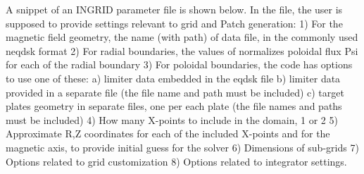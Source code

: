 \onecolumngrid
A snippet of an INGRID parameter file is shown below.
In the file, the user is supposed to provide settings relevant to grid and Patch generation:
1) For the magnetic field geometry, the name (with path) of data file, in the commonly used neqdsk format
2) For radial boundaries, the values of normalizes poloidal flux Psi for each of the radial boundary
3) For poloidal boundaries, the code has options to use one of these: 
	a) limiter data embedded in the eqdsk file
	b) limiter data provided in a separate file (the file name and path must be included)
	c) target plates geometry in separate files, one per each plate (the file names and paths must be included)
4) How many X-points to include in the domain, 1 or 2
5) Approximate R,Z coordinates for each of the included X-points and for the magnetic axis, to provide initial guess for the solver
6) Dimensions of sub-grids
7) Options related to grid customization
8) Options related to integrator settings.



